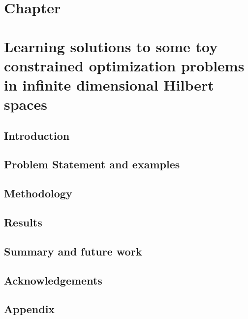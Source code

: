\chapter*{Chapter }
\textit{}
\newpage

\chapter{Learning solutions to some toy constrained optimization problems in infinite dimensional Hilbert spaces}
\section{Introduction}
\label{sec-intro--var-ml}


\section{Problem Statement and examples}
\label{sec-prob--var-ml}


\section{Methodology}
\label{sec-method--var-ml}


\section{Results}
\label{sec-results--var-ml}



\section{Summary and future work}
\label{sec-conclusions--var-ml}


\section*{Acknowledgements}


\section{Appendix}
\label{sec-appendix--var-ml}





